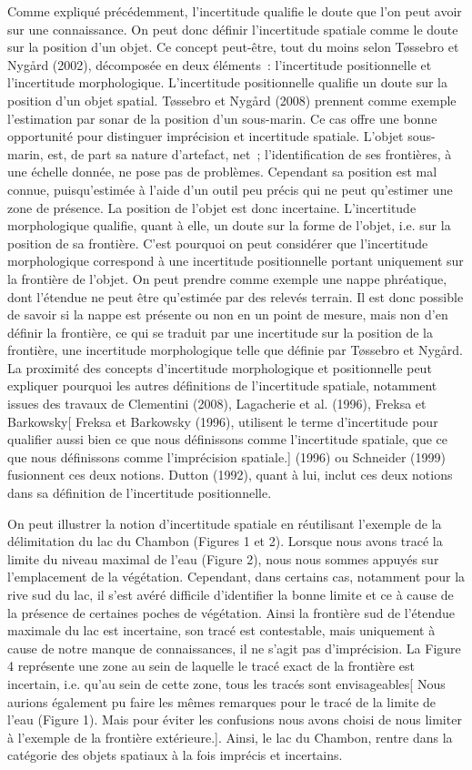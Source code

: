 Comme expliqué précédemment, l’incertitude qualifie le doute que l’on
peut avoir sur une connaissance. On peut donc définir l’incertitude
spatiale comme le doute sur la position d’un objet. Ce concept
peut-être, tout du moins selon Tøssebro et Nygård (2002), décomposée
en deux éléments : l’incertitude positionnelle et l’incertitude
morphologique. L’incertitude positionnelle qualifie un doute sur la
position d’un objet spatial. Tøssebro et Nygård (2008) prennent comme
exemple l’estimation par sonar de la position d’un sous-marin. Ce cas
offre une bonne opportunité pour distinguer imprécision et incertitude
spatiale. L’objet sous-marin, est, de part sa nature d’artefact, net ;
l’identification de ses frontières, à une échelle donnée, ne pose pas
de problèmes. Cependant sa position est mal connue, puisqu’estimée à
l’aide d’un outil peu précis qui ne peut qu’estimer une zone de
présence. La position de l’objet est donc incertaine. L’incertitude
morphologique qualifie, quant à elle, un doute sur la forme de
l’objet, i.e. sur la position de sa frontière. C’est pourquoi on peut
considérer que l’incertitude morphologique correspond à une
incertitude positionnelle portant uniquement sur la frontière de
l’objet. On peut prendre comme exemple une nappe phréatique, dont
l’étendue ne peut être qu’estimée par des relevés terrain. Il est donc
possible de savoir si la nappe est présente ou non en un point de
mesure, mais non d’en définir la frontière, ce qui se traduit par une
incertitude sur la position de la frontière, une incertitude
morphologique telle que définie par Tøssebro et Nygård. La proximité
des concepts d’incertitude morphologique et positionnelle peut
expliquer pourquoi les autres définitions de l’incertitude spatiale,
notamment issues des travaux de Clementini (2008), Lagacherie et
al. (1996), Freksa et Barkowsky[ Freksa et Barkowsky (1996), utilisent
le terme d’incertitude pour qualifier aussi bien ce que nous
définissons comme l’incertitude spatiale, que ce que nous définissons
comme l’imprécision spatiale.] (1996) ou Schneider (1999) fusionnent
ces deux notions. Dutton (1992), quant à lui, inclut ces deux notions
dans sa définition de l’incertitude positionnelle.

On peut illustrer la notion d’incertitude spatiale en réutilisant
l’exemple de la délimitation du lac du Chambon (Figures 1 et
2). Lorsque nous avons tracé la limite du niveau maximal de l’eau
(Figure 2), nous nous sommes appuyés sur l’emplacement de la
végétation. Cependant, dans certains cas, notamment pour la rive sud
du lac, il s’est avéré difficile d’identifier la bonne limite et ce à
cause de la présence de certaines poches de végétation. Ainsi la
frontière sud de l’étendue maximale du lac est incertaine, son tracé
est contestable, mais uniquement à cause de notre manque de
connaissances, il ne s’agit pas d’imprécision. La Figure 4 représente
une zone au sein de laquelle le tracé exact de la frontière est
incertain, i.e. qu’au sein de cette zone, tous les tracés sont
envisageables[ Nous aurions également pu faire les mêmes remarques
pour le tracé de la limite de l’eau (Figure 1). Mais pour éviter les
confusions nous avons choisi de nous limiter à l’exemple de la
frontière extérieure.]. Ainsi, le lac du Chambon, rentre dans la
catégorie des objets spatiaux à la fois imprécis et incertains.

